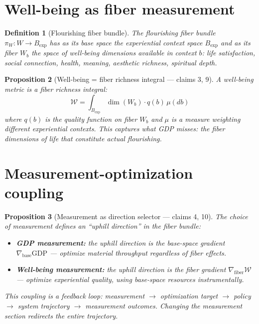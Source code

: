\documentclass[11pt,a4paper]{article}
\newtheorem{definition}{Definition}[section]
\newtheorem{proposition}[definition]{Proposition}
\begin{document}
\section{Well-being as fiber measurement}

\begin{definition}[Flourishing fiber bundle]
The \emph{flourishing fiber bundle} $\pi_W : W \to B_{\text{exp}}$ has
as its base space the experiential context space $B_{\text{exp}}$ and as
its fiber $W_b$ the space of well-being dimensions available in context
$b$: life satisfaction, social connection, health, meaning, aesthetic
richness, spiritual depth.
\end{definition}

\begin{proposition}[Well-being = fiber richness integral --- claims 3, 9]
\label{prop:wellbeing}
A well-being metric is a fiber richness integral:
\[
  \mathcal{W} = \int_{B_{\text{exp}}} \dim(W_b) \cdot q(b) \, \mu(db)
\]
where $q(b)$ is the quality function on fiber $W_b$ and $\mu$ is a
measure weighting different experiential contexts. This captures what
GDP misses: the fiber dimensions of life that constitute actual
flourishing.
\end{proposition}

\section{Measurement-optimization coupling}

\begin{proposition}[Measurement as direction selector --- claims 4, 10]
\label{prop:coupling}
The choice of measurement defines an ``uphill direction'' in the
fiber bundle:
\begin{itemize}
  \item \textbf{GDP measurement:} the uphill direction is the base-space
    gradient $\nabla_{\text{base}} \text{GDP}$ --- optimize material
    throughput regardless of fiber effects.
  \item \textbf{Well-being measurement:} the uphill direction is the
    fiber gradient $\nabla_{\text{fiber}} \mathcal{W}$ --- optimize
    experiential quality, using base-space resources instrumentally.
\end{itemize}
This coupling is a feedback loop: measurement $\to$ optimization target
$\to$ policy $\to$ system trajectory $\to$ measurement outcomes.
Changing the measurement section redirects the entire trajectory.
\end{proposition}
\end{document}
